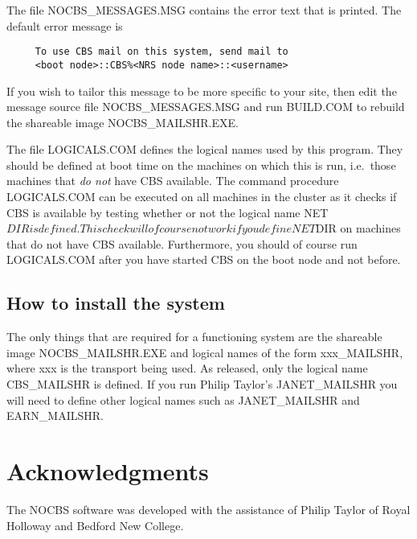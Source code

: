 The file NOCBS\_MESSAGES.MSG contains the error text that is printed.
The default error message is

\begin{verbatim}
     To use CBS mail on this system, send mail to
     <boot node>::CBS%<NRS node name>::<username>
\end{verbatim}

If you wish to tailor this message to be more specific to your site, then edit
the message source file NOCBS\_MESSAGES.MSG and run BUILD.COM to rebuild the
shareable image NOCBS\_MAILSHR.EXE.

The file LOGICALS.COM defines the logical names used by this program. They
should be defined at boot time on the machines on which this is run, i.e.\ those
machines that {\em do not} have CBS available. The command procedure
LOGICALS.COM can be executed on all machines in the cluster as it checks if CBS
is available by testing whether or not the logical name NET$DIR is defined. This
check will of course not work if you define NET$DIR on machines that do not have
CBS available. Furthermore, you should of course run LOGICALS.COM after you have
started CBS on the boot node and not before.

\subsection{How to install the system}

The only things that are required for a functioning system are the shareable
image NOCBS\_MAILSHR.EXE and logical names of the form xxx\_MAILSHR, where xxx
is the transport being used. As released, only the logical name CBS\_MAILSHR is
defined. If you run Philip Taylor's JANET\_MAILSHR you will need to define
other logical names such as JANET\_MAILSHR and EARN\_MAILSHR.

\section{Acknowledgments}

The NOCBS software was developed with the assistance of Philip Taylor of Royal
Holloway and Bedford New College.


